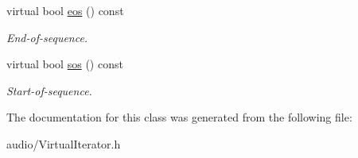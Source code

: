\begin{DoxyCompactItemize}
\item 
virtual bool \hyperlink{classAudio_1_1VirtualStandardIterator_adea94b3b1b046a59406282707ca4ec3c}{eos} () const \hypertarget{classAudio_1_1VirtualStandardIterator_adea94b3b1b046a59406282707ca4ec3c}{}\label{classAudio_1_1VirtualStandardIterator_adea94b3b1b046a59406282707ca4ec3c}

\begin{DoxyCompactList}\small\item\em End-\/of-\/sequence. \end{DoxyCompactList}\item 
virtual bool \hyperlink{classAudio_1_1VirtualStandardIterator_a926f4a49b9505f7545e6dc4b58ad7a9d}{sos} () const \hypertarget{classAudio_1_1VirtualStandardIterator_a926f4a49b9505f7545e6dc4b58ad7a9d}{}\label{classAudio_1_1VirtualStandardIterator_a926f4a49b9505f7545e6dc4b58ad7a9d}

\begin{DoxyCompactList}\small\item\em Start-\/of-\/sequence. \end{DoxyCompactList}\end{DoxyCompactItemize}


The documentation for this class was generated from the following file\+:\begin{DoxyCompactItemize}
\item 
audio/Virtual\+Iterator.\+h\end{DoxyCompactItemize}
